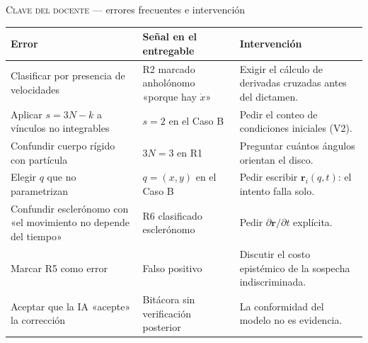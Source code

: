 \documentclass[10pt,aspectratio=169]{beamer}
\newcommand{\rv}{\mathbf{r}}
\begin{document}
\begin{frame}{\textsc{Clave del docente} --- errores frecuentes e intervención}
  \scriptsize
  \begin{table}
  \begin{tabular}{@{}p{4.6cm}p{4.2cm}p{5.0cm}@{}}
    \toprule
    \textbf{Error} & \textbf{Señal en el entregable} & \textbf{Intervención} \\
    \midrule
    Clasificar por presencia de velocidades & R2 marcado anholónomo «porque hay $\dot x$» & Exigir el cálculo de derivadas cruzadas antes del dictamen. \\
    Aplicar $s=3N-k$ a vínculos no integrables & $s=2$ en el Caso B & Pedir el conteo de condiciones iniciales (V2). \\
    Confundir cuerpo rígido con partícula & $3N=3$ en R1 & Preguntar cuántos ángulos orientan el disco. \\
    Elegir $q$ que no parametrizan & $q=(x,y)$ en el Caso B & Pedir escribir $\rv_i(q,t)$: el intento falla solo. \\
    Confundir esclerónomo con «el movimiento no depende del tiempo» & R6 clasificado esclerónomo & Pedir $\partial\rv/\partial t$ explícita. \\
    Marcar R5 como error & Falso positivo & Discutir el costo epistémico de la sospecha indiscriminada. \\
    Aceptar que la IA «acepte» la corrección & Bitácora sin verificación posterior & La conformidad del modelo no es evidencia. \\
    \bottomrule
  \end{tabular}
  \end{table}
\end{frame}
\end{document}
